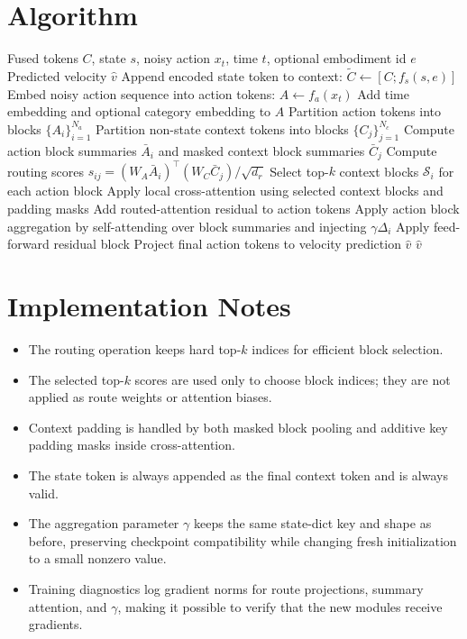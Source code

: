 \documentclass[11pt]{article}
\begin{document}
\section{Algorithm}

\begin{algorithm}[t]
\caption{BlockBottleneck Action Head Forward Pass}
\label{alg:blockbottleneck}
\begin{algorithmic}[1]
\Require Fused tokens $C$, state $s$, noisy action $x_t$, time $t$, optional embodiment id $e$
\Ensure Predicted velocity $\hat{v}$
\State Append encoded state token to context: $\tilde{C} \gets [C; f_s(s,e)]$
\State Embed noisy action sequence into action tokens: $A \gets f_a(x_t)$
\State Add time embedding and optional category embedding to $A$
    \State Partition action tokens into blocks $\{A_i\}_{i=1}^{N_a}$
    \State Partition non-state context tokens into blocks $\{C_j\}_{j=1}^{N_c}$
    \State Compute action block summaries $\bar{A}_i$ and masked context block summaries $\bar{C}_j$
    \State Compute routing scores $s_{ij} = (W_A\bar{A}_i)^\top(W_C\bar{C}_j)/\sqrt{d_r}$
    \State Select top-$k$ context blocks $\mathcal{S}_i$ for each action block
    \State Apply local cross-attention using selected context blocks and padding masks
    \State Add routed-attention residual to action tokens
    \State Apply action block aggregation by self-attending over block summaries and injecting $\gamma\Delta_i$
    \State Apply feed-forward residual block
\EndFor
\State Project final action tokens to velocity prediction $\hat{v}$
\State \Return $\hat{v}$
\end{algorithmic}
\end{algorithm}

\section{Implementation Notes}

\begin{itemize}
    \item The routing operation keeps hard top-$k$ indices for efficient block selection.
    \item The selected top-$k$ scores are used only to choose block indices; they are not applied as route weights or attention biases.
    \item Context padding is handled by both masked block pooling and additive key padding masks inside cross-attention.
    \item The state token is always appended as the final context token and is always valid.
    \item The aggregation parameter $\gamma$ keeps the same state-dict key and shape as before, preserving checkpoint compatibility while changing fresh initialization to a small nonzero value.
    \item Training diagnostics log gradient norms for route projections, summary attention, and $\gamma$, making it possible to verify that the new modules receive gradients.
\end{itemize}
\end{document}
